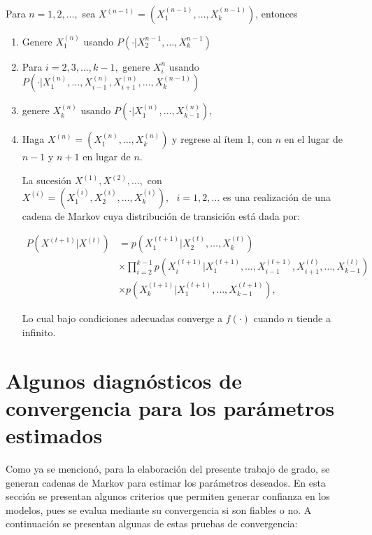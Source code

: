 Para $n=1,2,\dots,$ sea $X^{(n-1)}=(X_1^{(n-1)},\dots,X_k^{(n-1)})$, entonces 

\begin{enumerate}
\item Genere $X_1^{(n)}$ usando $P(\cdot|X_2^{n-1},\dots,X_k^{n-1})$

\item Para $i=2,3,\dots,k-1,$ genere $X_i^n$ usando $P(\cdot |X_1^{(n)},\dots,X_{i-1}^{(n)},X_{i+1}^{(n)},\dots,X_{k}^{(n-1)})$

\item genere $X_k^{(n)}$ usando $P(\cdot | X_1^{(n)},\dots,X_{k-1}^{(n)})$,

\item Haga $X^{(n)}=(X_1^{(n)},\dots,X_k^{(n)})$ y regrese al ítem 1, con $n$ en el lugar de $n-1$ y $n+1$ en lugar de $n$.

La sucesión $X^{(1)},X^{(2)},...,$ con $X^{(i)}=(X_1^{(i)},X_2^{(i)},\dots,X_k^{(i)}), \text{  } i=1,2,\dots$ es una realización de una cadena de Markov cuya distribución de transición está dada por: 


\begin{equation} \label{gibbs}
\begin{split}
P(X^{(t+1)}|X^{(t)}) & = p(X_1^{(t+1)}|X_2^{(t)},\dots,X_k^{(t)} ) \\
 & \times \prod_{i=2}^{k-1}p(X_i^{(t+1)}|X_1^{(t+1)},\dots,X_{i-1}^{(t+1)},X_{i+1}^{(t)},\dots,X_{k-1}^{(t)}) 
 \\
 & \times p(X_{k}^{(t+1)}|X_{1}^{(t+1)},\dots,X_{k-1}^{(t+1)}),
\end{split}
\end{equation}


Lo cual bajo condiciones adecuadas converge a $f(\cdot)$ cuando $n$ tiende a infinito. 
\end{enumerate}

\section{Algunos diagnósticos de convergencia para los parámetros estimados}




Como ya se mencionó, para la elaboración del presente trabajo de grado, se generan cadenas de Markov para estimar los parámetros deseados. En esta sección se presentan algunos criterios que permiten generar confianza en los modelos, pues se evalua mediante su convergencia si son fiables o no. A continuación se presentan algunas de estas pruebas de convergencia:


